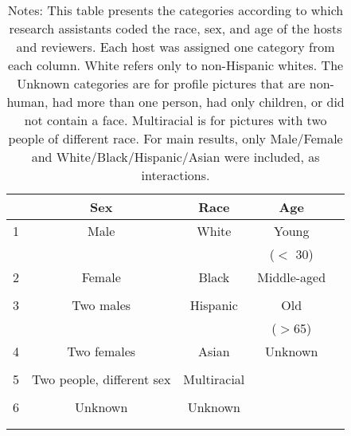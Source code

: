 {
\def\sym#1{\ifmmode^{#1}\else\(^{#1}\)\fi}
\begin{longtable}{l*{4}{c}}
\caption{Coding categories}\\
\hline\hline\endfirsthead\hline\endhead\hline\endfoot\endlastfoot
                    &\multicolumn{1}{c}{Sex}&\multicolumn{1}{c}{Race}&\multicolumn{1}{c}{Age}\\
\hline

1          &           Male         &           White         &           Young      \\ 
                    &                 &                  &          ($<$ 30)      \\
[1em]
2        &      Female  &      Black  &       Middle-aged     \\
                    &              &              &         \\
[1em]
3    &       Two males        &      Hispanic &       Old    \\
                    &              &              &     ($>$65)       \\
[1em]
4          &      Two females        &      Asian         &     Unknown      \\
                    &              &              &          \\
[1em]
5        &      Two people, different sex         &      Multiracial         &       \\
                    &              &              &       \\
[1em]
6    &       Unknown        &       Unknown  &        \\
                    &             &              &             \\
\hline\hline

\caption*{Notes: This table presents the categories according to which research assistants coded the race, sex, and age of the hosts and reviewers. Each host was assigned one category from each column. White refers only to non-Hispanic whites. The Unknown categories are for profile pictures that are non-human, had more than one person, had only children, or did not contain a face. Multiracial is for pictures with two people of different race. For main results, only Male/Female and White/Black/Hispanic/Asian were included, as interactions.}
\label{Table 1}


\end{longtable}
}

